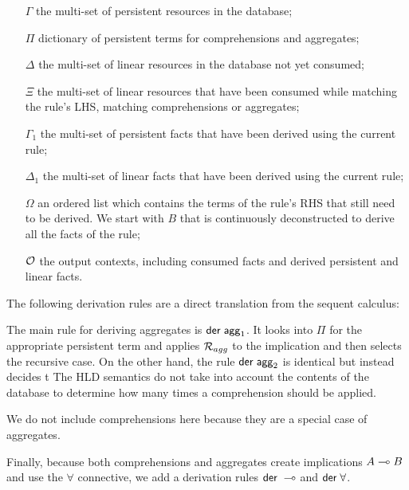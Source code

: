 \begin{enumerate}

   \item[$\Gamma$] the multi-set of persistent resources in the database;
   
   \item[$\Pi$] dictionary of persistent terms for comprehensions and
   aggregates;

   \item[$\Delta$] the multi-set of linear resources in the database not yet
   consumed;

   \item[$\Xi$] the multi-set of linear resources that have been consumed while
   matching the rule's LHS, matching comprehensions or aggregates;

   \item[$\Gamma_1$] the multi-set of persistent facts that have been derived
   using the current rule;

   \item[$\Delta_1$] the multi-set of linear facts that have been derived using
   the current rule;


   \item[$\Omega$] an ordered list which contains the terms of the rule's RHS
      that still need to be derived. We start with $B$ that is continuously
      deconstructed to derive all the facts of the rule;

   \item[$\mathcal{O}$] the output contexts, including consumed facts and derived
   persistent and linear facts.

\end{enumerate}

The following derivation rules are a direct translation from the sequent
calculus:



The main rule for deriving aggregates is $\mathsf{der} \; \mathsf{agg}_1$. It looks into
$\Pi$ for the appropriate persistent term and applies $\mathcal{R}_{agg}$ to the
implication and then selects the recursive case. On the other hand, the rule
$\mathsf{der} \; \mathsf{agg}_2$ is identical but instead decides t The HLD semantics do not
take into account the contents of the database to determine how many times a
comprehension should be applied.



We do not include comprehensions here because they are a special case of
aggregates.

Finally, because both comprehensions and aggregates create implications $A \multimap
B$ and use the $\forall$ connective, we add a derivation rules $\mathsf{der} \; \multimap$
and $\mathsf{der} \; \forall$.


